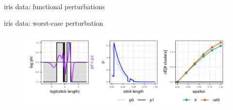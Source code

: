 \begin{frame}{iris data: functional perturbations}
  \begin{figure}[!h]
    \centering
\end{figure}
\end{frame}


\begin{frame}{iris data: worst-case perturbation}
  \begin{figure}[!h]
    \centering
    \includegraphics[width = \textwidth]{./figures/iris_worst_case.png}
\end{figure}
\end{frame}
